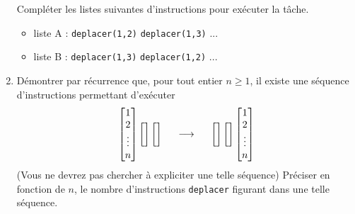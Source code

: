 \begin{enumerate}
Compléter les listes suivantes d'instructions pour exécuter la tâche.
\begin{itemize}
 \item liste A : \verb|deplacer(1,2)| \verb|deplacer(1,3)| ... 
 \item liste B : \verb|deplacer(1,3)| \verb|deplacer(1,2)| ...
\end{itemize}
\item Démontrer par récurrence que, pour tout entier $n\geq 1$, il existe une séquence d'instructions permettant d'exécuter
 \begin{displaymath}
\begin{bmatrix}
1 \\ 2  \\ \vdots \\ n                                                                                                          
\end{bmatrix} 
\begin{bmatrix}
  \\   \\                                                                                                           
\end{bmatrix} 
\begin{bmatrix}
 \\   \\                                                                                                           
\end{bmatrix} 
  \hspace{0.5cm} \longrightarrow \hspace{0.5cm}
\begin{bmatrix}
  \\   \\                                                                                                           
\end{bmatrix} 
\begin{bmatrix}
 \\   \\                                                                                                           
\end{bmatrix} 
\begin{bmatrix}
1 \\ 2  \\ \vdots \\ n                                                                                                          
\end{bmatrix}   
 \end{displaymath}
(Vous ne devrez pas chercher à expliciter une telle séquence)\newline
Préciser en fonction de $n$, le nombre d'instructions \texttt{deplacer} figurant dans une telle séquence. 
\end{enumerate}

